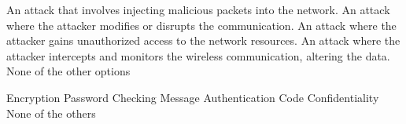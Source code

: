 \begin{checkboxes}
    \choice An attack that involves injecting malicious packets into the network.
    \choice An attack where the attacker modifies or disrupts the communication.
    \choice An attack where the attacker gains unauthorized access to the network resources.
    \choice An attack where the attacker intercepts and monitors the wireless communication, altering the data.
    \CorrectChoice None of the other options
\end{checkboxes}

\begin{checkboxes}
    \choice Encryption
    \choice Password Checking
    \choice Message Authentication Code
    \CorrectChoice Confidentiality
    \choice None of the others
\end{checkboxes}